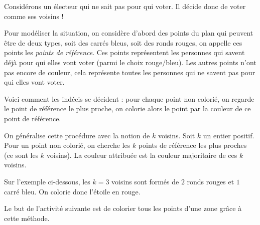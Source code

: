 \documentclass[11pt,class=report,crop=false]{standalone}
\begin{document}




\bigskip



\begin{cours}

Considérons un électeur qui ne sait pas pour qui voter. 
Il décide donc de voter comme ses voisins !


Pour modéliser la situation, on considère d'abord des points du plan qui peuvent être de deux types, soit des carrés bleus, soit des ronds rouges, on appelle ces points les \emph{points de référence}.
Ces points représentent les personnes qui savent déjà pour qui elles vont voter (parmi le choix rouge/bleu).
Les autres points n'ont pas encore de couleur, cela représente toutes les personnes qui ne savent pas pour qui elles vont voter.

Voici comment les indécis se décident : 
pour chaque point non colorié, on regarde le point de référence le plus proche, on colorie alors le point par la couleur de ce point de référence.


On généralise cette procédure avec la notion de \og{}$k$ voisins\fg{}.
Soit $k$ un entier positif. Pour un point non colorié, on cherche
les $k$ points de référence les plus proches (ce sont les $k$ voisins). La couleur attribuée est la couleur majoritaire de ces $k$ voisins.

Sur l'exemple ci-dessous, les $k=3$ voisins sont formés de $2$ ronds rouges et $1$ carré bleu. On colorie donc l'étoile en rouge.

Le but de l'activité suivante est de colorier tous les points d'une zone grâce à cette méthode.
\end{cours}
\end{document}
